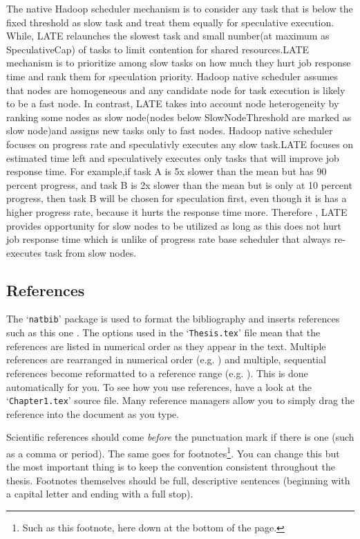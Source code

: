 The native Hadoop scheduler mechanism is to consider any task that is below the fixed threshold as slow task and treat them equally for speculative execution. While, LATE relaunches the slowest task and small number(at maximum as SpeculativeCap) of tasks to limit contention for shared resources.LATE mechanism is to prioritize among slow tasks on how much they hurt job response time and rank them for speculation priority.
Hadoop native scheduler assumes that nodes are homogeneous and any candidate node for task execution is likely to be a fast node. In contrast, LATE takes into account node heterogeneity by ranking some nodes as slow node(nodes below SlowNodeThreshold are marked as slow node)and assigns new tasks only to fast nodes.
Hadoop native scheduler focuses on progress rate and speculativly executes any slow task.LATE focuses on estimated time left and speculatively executes only tasks that will improve job response time. For example,if task A is 5x slower than the mean but has 90 percent progress, and task B is 2x slower than the mean but is only at 10 percent progress, then task B will be chosen for speculation first, even though it is has a higher progress rate, because it hurts the response time more. Therefore , LATE provides opportunity for slow nodes to be utilized as long as this does not hurt job response time which is unlike of progress rate base scheduler that always re-executes task from slow nodes.      





\subsection{References}

The `\texttt{natbib}' package is used to format the bibliography and inserts references such as this one \citep{Reference3}. The options used in the `\texttt{Thesis.tex}' file mean that the references are listed in numerical order as they appear in the text. Multiple references are rearranged in numerical order (e.g. \citep{Reference2, Reference1}) and multiple, sequential references become reformatted to a reference range (e.g. \citep{Reference2, Reference1, Reference3}). This is done automatically for you. To see how you use references, have a look at the `\texttt{Chapter1.tex}' source file. Many reference managers allow you to simply drag the reference into the document as you type.

Scientific references should come \emph{before} the punctuation mark if there is one (such as a comma or period). The same goes for footnotes\footnote{Such as this footnote, here down at the bottom of the page.}. You can change this but the most important thing is to keep the convention consistent throughout the thesis. Footnotes themselves should be full, descriptive sentences (beginning with a capital letter and ending with a full stop).

